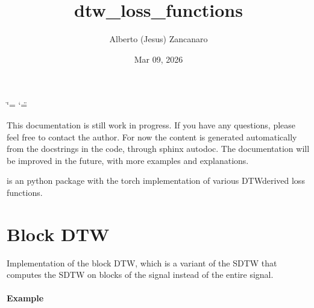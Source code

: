 \documentclass[letterpaper,10pt,english]{sphinxmanual}
\title{dtw\_loss\_functions}
\date{Mar 09, 2026}
\author{Alberto (Jesus) Zancanaro}
\begin{document}
\ifdefined\shorthandoff
  \ifnum\catcode`\=\string=\active\shorthandoff{=}\fi
  \ifnum\catcode`\"=\active{}\fi
\fi

\pagestyle{empty}
\sphinxmaketitle
\pagestyle{plain}
\sphinxtableofcontents
\pagestyle{normal}
\label{\detokenize{index::doc}}


\sphinxAtStartPar
This documentation is still work in progress. If you have any questions, please feel free to contact the author.
For now the content is generated automatically from the docstrings in the code, through sphinx autodoc. The documentation will be improved in the future, with more examples and explanations.

\sphinxAtStartPar
{} is an python package with the torch implementation of various DTW\sphinxhyphen{}derived loss functions.

\sphinxstepscope


\chapter{Block DTW}
\label{\detokenize{dtw_loss_functions.block_dtw:module-dtw_loss_functions.block_dtw}}\label{\detokenize{dtw_loss_functions.block_dtw:block-dtw}}\label{\detokenize{dtw_loss_functions.block_dtw::doc}}
\sphinxAtStartPar
Implementation of the block DTW, which is a variant of the SDTW that computes the SDTW on blocks of the signal instead of the entire signal.
\subsubsection*{Example}
\end{document}
